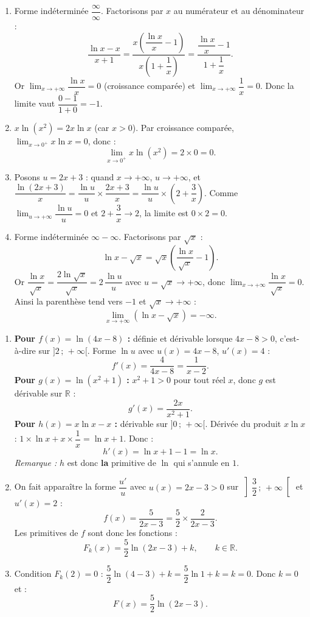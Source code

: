 \documentclass[11pt]{article}
\begin{document}
\begin{corrige}
\begin{enumerate}
\item Forme indéterminée $\dfrac{\infty}{\infty}$. Factorisons par $x$ au numérateur et au dénominateur :
\[ \dfrac{\ln x - x}{x+1}=\dfrac{x\left(\dfrac{\ln x}{x}-1\right)}{x\left(1+\dfrac{1}{x}\right)}=\dfrac{\dfrac{\ln x}{x}-1}{1+\dfrac{1}{x}}. \]
Or $\displaystyle\lim_{x\to+\infty}\dfrac{\ln x}{x}=0$ (croissance comparée) et $\displaystyle\lim_{x\to+\infty}\dfrac{1}{x}=0$. Donc la limite vaut $\dfrac{0-1}{1+0}=\boxed{-1}$.
\item $x\ln(x^2)=2x\ln x$ (car $x>0$). Par croissance comparée, $\displaystyle\lim_{x\to 0^+}x\ln x=0$, donc :
\[ \lim_{x\to 0^+}x\ln(x^2)=2\times 0=0. \]
\item Posons $u=2x+3$ : quand $x\to+\infty$, $u\to+\infty$, et $\dfrac{\ln(2x+3)}{x}=\dfrac{\ln u}{u}\times\dfrac{2x+3}{x}=\dfrac{\ln u}{u}\times\left(2+\dfrac{3}{x}\right)$. Comme $\displaystyle\lim_{u\to+\infty}\dfrac{\ln u}{u}=0$ et $2+\dfrac{3}{x}\to 2$, la limite est $0\times 2=\boxed{0}$.
\item Forme indéterminée $\infty-\infty$. Factorisons par $\sqrt{x}$ :
\[ \ln x-\sqrt{x}=\sqrt{x}\left(\dfrac{\ln x}{\sqrt{x}}-1\right). \]
Or $\dfrac{\ln x}{\sqrt{x}}=\dfrac{2\ln\sqrt{x}}{\sqrt{x}}=2\,\dfrac{\ln u}{u}$ avec $u=\sqrt{x}\to+\infty$, donc $\displaystyle\lim_{x\to+\infty}\dfrac{\ln x}{\sqrt{x}}=0$. Ainsi la parenthèse tend vers $-1$ et $\sqrt{x}\to+\infty$ :
\[ \lim_{x\to+\infty}\left(\ln x-\sqrt{x}\right)=-\infty. \]
\end{enumerate}
\end{corrige}

\begin{corrige}
\begin{enumerate}
\item \textbf{Pour $f(x)=\ln(4x-8)$ :} définie et dérivable lorsque $4x-8>0$, c'est-à-dire sur $]2\,;\,+\infty[$. Forme $\ln u$ avec $u(x)=4x-8$, $u'(x)=4$ :
\[ f'(x)=\dfrac{4}{4x-8}=\dfrac{1}{x-2}. \]
\textbf{Pour $g(x)=\ln(x^2+1)$ :} $x^2+1>0$ pour tout réel $x$, donc $g$ est dérivable sur $\mathbb{R}$ :
\[ g'(x)=\dfrac{2x}{x^2+1}. \]
\textbf{Pour $h(x)=x\ln x - x$ :} dérivable sur $]0\,;\,+\infty[$. Dérivée du produit $x\ln x$ : $1\times\ln x+x\times\dfrac{1}{x}=\ln x+1$. Donc :
\[ h'(x)=\ln x+1-1=\ln x. \]
\emph{Remarque :} $h$ est donc \textbf{la} primitive de $\ln$ qui s'annule en $1$.
\item On fait apparaître la forme $\dfrac{u'}{u}$ avec $u(x)=2x-3>0$ sur $\left]\dfrac{3}{2}\,;\,+\infty\right[$ et $u'(x)=2$ :
\[ f(x)=\dfrac{5}{2x-3}=\dfrac{5}{2}\times\dfrac{2}{2x-3}. \]
Les primitives de $f$ sont donc les fonctions :
\[ F_k(x)=\dfrac{5}{2}\ln(2x-3)+k, \qquad k\in\mathbb{R}. \]
\item Condition $F_k(2)=0$ : $\dfrac{5}{2}\ln(4-3)+k=\dfrac{5}{2}\ln 1+k=k=0$. Donc $k=0$ et :
\[ F(x)=\dfrac{5}{2}\ln(2x-3). \]
\end{enumerate}
\end{corrige}
\end{document}

